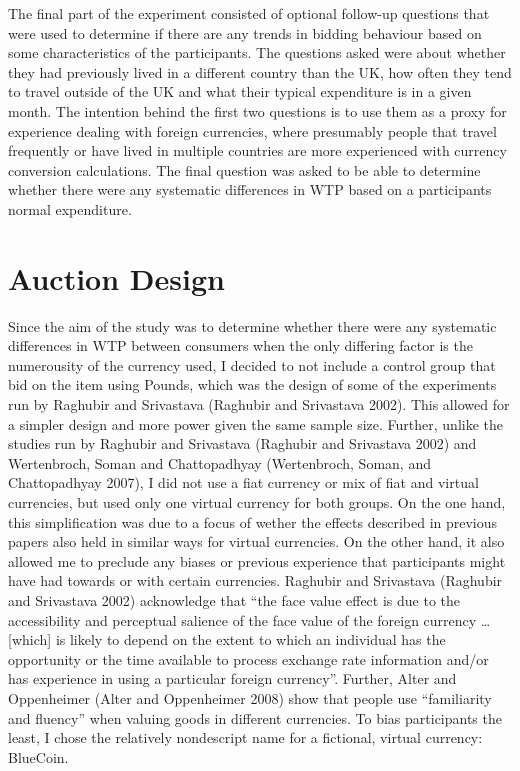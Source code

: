 \documentclass[
]{report}
\begin{document}
The final part of the experiment consisted of optional follow-up
questions that were used to determine if there are any trends in bidding
behaviour based on some characteristics of the participants. The
questions asked were about whether they had previously lived in a
different country than the UK, how often they tend to travel outside of
the UK and what their typical expenditure is in a given month. The
intention behind the first two questions is to use them as a proxy for
experience dealing with foreign currencies, where presumably people that
travel frequently or have lived in multiple countries are more
experienced with currency conversion calculations. The final question
was asked to be able to determine whether there were any systematic
differences in WTP based on a participants normal expenditure.

\section{Auction Design}\label{auction-design}

Since the aim of the study was to determine whether there were any
systematic differences in WTP between consumers when the only differing
factor is the numerousity of the currency used, I decided to not include
a control group that bid on the item using Pounds, which was the design
of some of the experiments run by Raghubir and Srivastava (Raghubir and
Srivastava 2002). This allowed for a simpler design and more power given
the same sample size. Further, unlike the studies run by Raghubir and
Srivastava (Raghubir and Srivastava 2002) and Wertenbroch, Soman and
Chattopadhyay (Wertenbroch, Soman, and Chattopadhyay 2007), I did not
use a fiat currency or mix of fiat and virtual currencies, but used only
one virtual currency for both groups. On the one hand, this
simplification was due to a focus of wether the effects described in
previous papers also held in similar ways for virtual currencies. On the
other hand, it also allowed me to preclude any biases or previous
experience that participants might have had towards or with certain
currencies. Raghubir and Srivastava (Raghubir and Srivastava 2002)
acknowledge that ``the face value effect is due to the accessibility and
perceptual salience of the face value of the foreign currency \ldots{}
{[}which{]} is likely to depend on the extent to which an individual has
the opportunity or the time available to process exchange rate
information and/or has experience in using a particular foreign
currency''. Further, Alter and Oppenheimer (Alter and Oppenheimer 2008)
show that people use ``familiarity and fluency'' when valuing goods in
different currencies. To bias participants the least, I chose the
relatively nondescript name for a fictional, virtual currency: BlueCoin.
\end{document}
